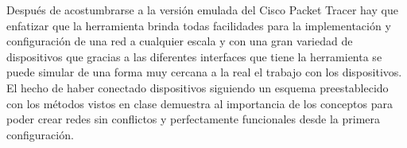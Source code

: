 Después de acostumbrarse a la versión emulada del Cisco Packet Tracer hay que enfatizar
que la herramienta brinda todas facilidades para la implementación y configuración de una
red a cualquier escala y con una gran variedad de dispositivos que gracias a las diferentes
interfaces que tiene la herramienta se puede simular de una forma muy cercana a la real
el trabajo con los dispositivos.\\
El hecho de haber conectado dispositivos siguiendo un esquema preestablecido con los
métodos vistos en clase demuestra al importancia de los conceptos para poder crear
redes sin conflictos y perfectamente funcionales desde la primera configuración.